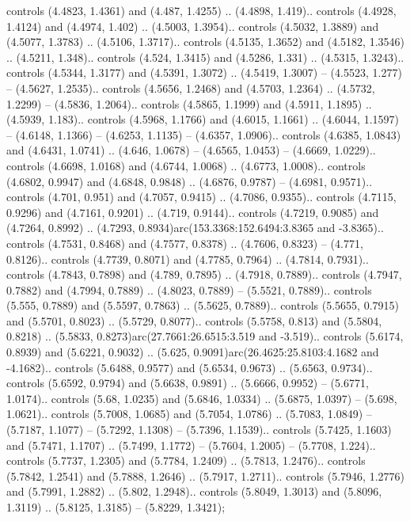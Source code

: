 controls (4.4823, 1.4361) and (4.487, 1.4255) .. (4.4898, 1.419).. controls (4.4928, 1.4124) and (4.4974, 1.402) .. (4.5003, 1.3954).. controls (4.5032, 1.3889) and (4.5077, 1.3783) .. (4.5106, 1.3717).. controls (4.5135, 1.3652) and (4.5182, 1.3546) .. (4.5211, 1.348).. controls (4.524, 1.3415) and (4.5286, 1.331) .. (4.5315, 1.3243).. controls (4.5344, 1.3177) and (4.5391, 1.3072) .. (4.5419, 1.3007) -- (4.5523, 1.277) -- (4.5627, 1.2535).. controls (4.5656, 1.2468) and (4.5703, 1.2364) .. (4.5732, 1.2299) -- (4.5836, 1.2064).. controls (4.5865, 1.1999) and (4.5911, 1.1895) .. (4.5939, 1.183).. controls (4.5968, 1.1766) and (4.6015, 1.1661) .. (4.6044, 1.1597) -- (4.6148, 1.1366) -- (4.6253, 1.1135) -- (4.6357, 1.0906).. controls (4.6385, 1.0843) and (4.6431, 1.0741) .. (4.646, 1.0678) -- (4.6565, 1.0453) -- (4.6669, 1.0229).. controls (4.6698, 1.0168) and (4.6744, 1.0068) .. (4.6773, 1.0008).. controls (4.6802, 0.9947) and (4.6848, 0.9848) .. (4.6876, 0.9787) -- (4.6981, 0.9571).. controls (4.701, 0.951) and (4.7057, 0.9415) .. (4.7086, 0.9355).. controls (4.7115, 0.9296) and (4.7161, 0.9201) .. (4.719, 0.9144).. controls (4.7219, 0.9085) and (4.7264, 0.8992) .. (4.7293, 0.8934)arc(153.3368:152.6494:3.8365 and -3.8365).. controls (4.7531, 0.8468) and (4.7577, 0.8378) .. (4.7606, 0.8323) -- (4.771, 0.8126).. controls (4.7739, 0.8071) and (4.7785, 0.7964) .. (4.7814, 0.7931).. controls (4.7843, 0.7898) and (4.789, 0.7895) .. (4.7918, 0.7889).. controls (4.7947, 0.7882) and (4.7994, 0.7889) .. (4.8023, 0.7889) -- (5.5521, 0.7889).. controls (5.555, 0.7889) and (5.5597, 0.7863) .. (5.5625, 0.7889).. controls (5.5655, 0.7915) and (5.5701, 0.8023) .. (5.5729, 0.8077).. controls (5.5758, 0.813) and (5.5804, 0.8218) .. (5.5833, 0.8273)arc(27.7661:26.6515:3.519 and -3.519).. controls (5.6174, 0.8939) and (5.6221, 0.9032) .. (5.625, 0.9091)arc(26.4625:25.8103:4.1682 and -4.1682).. controls (5.6488, 0.9577) and (5.6534, 0.9673) .. (5.6563, 0.9734).. controls (5.6592, 0.9794) and (5.6638, 0.9891) .. (5.6666, 0.9952) -- (5.6771, 1.0174).. controls (5.68, 1.0235) and (5.6846, 1.0334) .. (5.6875, 1.0397) -- (5.698, 1.0621).. controls (5.7008, 1.0685) and (5.7054, 1.0786) .. (5.7083, 1.0849) -- (5.7187, 1.1077) -- (5.7292, 1.1308) -- (5.7396, 1.1539).. controls (5.7425, 1.1603) and (5.7471, 1.1707) .. (5.7499, 1.1772) -- (5.7604, 1.2005) -- (5.7708, 1.224).. controls (5.7737, 1.2305) and (5.7784, 1.2409) .. (5.7813, 1.2476).. controls (5.7842, 1.2541) and (5.7888, 1.2646) .. (5.7917, 1.2711).. controls (5.7946, 1.2776) and (5.7991, 1.2882) .. (5.802, 1.2948).. controls (5.8049, 1.3013) and (5.8096, 1.3119) .. (5.8125, 1.3185) -- (5.8229, 1.3421);



